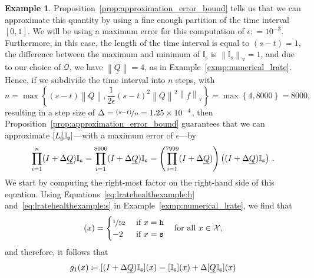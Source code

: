 \documentclass[10pt,a4paper]{paper}
\theoremstyle{definition}
\newtheorem{exmp}{Example}%
\newcommand{\states}{\mathcal{X}}
\newcommand{\ind}[1]{\mathbb{I}_{#1}}
\newcommand{\rateset}{\mathcal{Q}}
\newcommand{\lrate}{\underline{Q}}
\newcommand{\norm}[1]{\left\lVert #1 \right\rVert}
\newcommand{\coloneqq}{:\!=}
\begin{document}
\begin{exmp}
Proposition~\ref{prop:approximation_error_bound} tells us that we can approximate this quantity by using a fine enough partition of the time interval $[0,1]$. We will be using a maximum error for this computation of $\epsilon\coloneqq 10^{-3}$. Furthermore, in this case, the length of the time interval is equal to $(s-t)=1$, the difference between the maximum and minimum of $\ind{\text{s}}$ is $\norm{\ind{\text{s}}}_\mathrm{v}=1$, and due to our choice of $\rateset$, we have $\norm{\lrate} = 4$, as in Example~\ref{exmp:numerical_lrate}. Hence, if we subdivide the time interval into $n$ steps, with
\begin{equation*}
n=\max\left\{
(s-t)\norm{\lrate},
\frac{1}{2\epsilon}(s-t)^2\norm{\lrate}^2\norm{f}_\mathrm{v}
\right\}
=\max\left\{4,8000\right\}=8000,
\end{equation*}
resulting in a step size of $\Delta=\nicefrac{(s-t)}{n}=1.25\times 10^{-4}$, then %
Proposition~\ref{prop:approximation_error_bound} guarantees that we can approximate $[L_0^1\ind{\text{{\tt s}}}]$---with a maximum error of $\epsilon$---by
\begin{equation*}
\prod_{i=1}^n(I + \Delta\lrate)\ind{\text{{\tt s}}} = \prod_{i=1}^{8000}(I + \Delta\lrate)\ind{\text{{\tt s}}} = \left(\prod_{i=1}^{7999}(I + \Delta\lrate)\right)\left((I+\Delta\lrate)\ind{\text{{\tt s}}}\right)\,.
\end{equation*}
We start by computing the right-most factor on the right-hand side of this equation. Using Equations~\eqref{eq:lratehealthexample:h} and~\eqref{eq:lratehealthexample:s} in Example~\ref{exmp:numerical_lrate}, we find that
\begin{equation*}
[\lrate\ind{\text{{\tt s}}}](x)
=
\begin{cases}
\nicefrac{1}{52}
&\text{ if $x=\text{\tt h}$}\\
-2
&\text{ if $x=\text{\tt s}$}
\end{cases}
~~~\text{for all $x\in\states$},
\end{equation*}
and therefore, it follows that
\begin{align*}
g_1(x)\coloneqq[(I + \Delta\lrate)\ind{\text{{\tt s}}}](x)
&= [\ind{\text{{\tt s}}}](x) + \Delta[\lrate\ind{\text{{\tt s}}}](x)\\

\end{align*}
\end{exmp}
\end{document}
